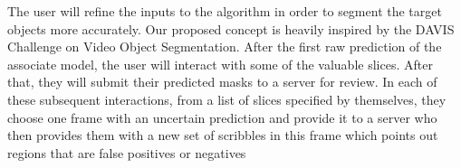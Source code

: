 The user will refine the inputs to the algorithm in order to segment the target objects more accurately. Our proposed concept is heavily inspired by the DAVIS Challenge on Video Object Segmentation. After the first raw prediction of the associate model, the user will interact with some of the valuable slices. After that, they will submit their predicted masks to a server for review. In each of these subsequent interactions, from a list of slices specified by themselves, they choose one frame with an uncertain prediction and provide it to a server who then provides them with a new set of scribbles in this frame which points out regions that are false positives or negatives 



